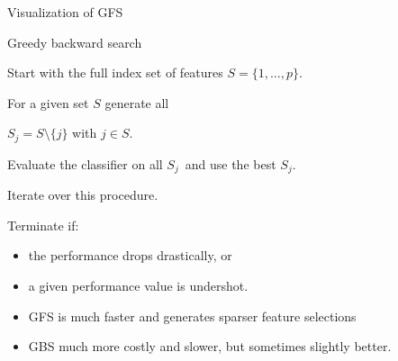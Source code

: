 \documentclass[11pt,compress,t,notes=noshow, xcolor=table]{beamer}
\begin{document}
\begin{vbframe}{Visualization of GFS}
  \end{vbframe}


  \begin{vbframe}{Greedy backward search}


    \begin{blocki}{}
      \item Start with the full index set of features $S = \{1, \ldots, p\}$.
      \item For a given set $S$ generate all

      $S_j = S \setminus\{j\}$ with $j \in S$.
      \item Evaluate the classifier on all $S_j$\
        and use the best $S_j$.
      \item Iterate over this procedure.
      \item Terminate if:
        \begin{itemize}
          \item the performance drops drastically, or
          \item a given performance value is undershot.
        \end{itemize}
      \end{blocki}

      \begin{itemize}
          \item GFS is much faster and generates sparser feature selections
          \item GBS much more costly and slower, but sometimes slightly better.
      \end{itemize}
    
  \end{vbframe}
\end{document}
